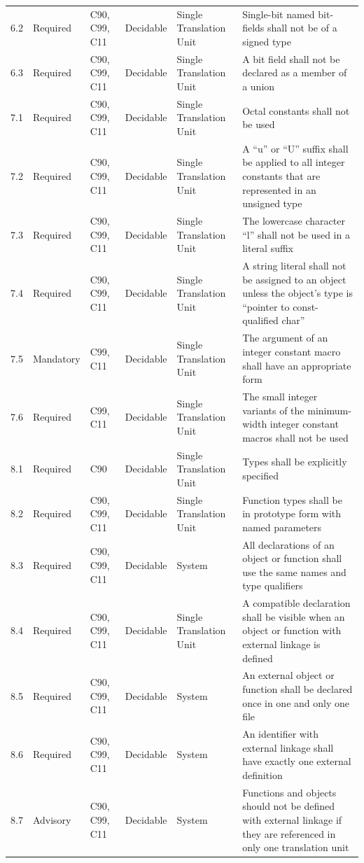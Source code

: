 \documentclass[11pt]{article}
\begin{document}
{\begin{longtable}{@{}p{1.0cm}p{1.6cm}p{1.8cm}p{2.0cm}p{1.6cm}p{7.4cm}@{}}
6.2 & Required & C90, C99, C11 & Decidable & Single Translation Unit & Single-bit named bit-fields shall not be of a signed type \\
6.3 & Required & C90, C99, C11 & Decidable & Single Translation Unit & A bit field shall not be declared as a member of a union \\
7.1 & Required & C90, C99, C11 & Decidable & Single Translation Unit & Octal constants shall not be used \\
7.2 & Required & C90, C99, C11 & Decidable & Single Translation Unit & A ``u'' or ``U'' suffix shall be applied to all integer constants that are represented in an unsigned type \\
7.3 & Required & C90, C99, C11 & Decidable & Single Translation Unit & The lowercase character ``l'' shall not be used in a literal suffix \\
7.4 & Required & C90, C99, C11 & Decidable & Single Translation Unit & A string literal shall not be assigned to an object unless the object's type is ``pointer to const-qualified char'' \\
7.5 & Mandatory & C99, C11 & Decidable & Single Translation Unit & The argument of an integer constant macro shall have an appropriate form \\
7.6 & Required & C99, C11 & Decidable & Single Translation Unit & The small integer variants of the minimum-width integer constant macros shall not be used \\
8.1 & Required & C90 & Decidable & Single Translation Unit & Types shall be explicitly specified \\
8.2 & Required & C90, C99, C11 & Decidable & Single Translation Unit & Function types shall be in prototype form with named parameters \\
8.3 & Required & C90, C99, C11 & Decidable & System & All declarations of an object or function shall use the same names and type qualifiers \\
8.4 & Required & C90, C99, C11 & Decidable & Single Translation Unit & A compatible declaration shall be visible when an object or function with external linkage is defined \\
8.5 & Required & C90, C99, C11 & Decidable & System & An external object or function shall be declared once in one and only one file \\
8.6 & Required & C90, C99, C11 & Decidable & System & An identifier with external linkage shall have exactly one external definition \\
8.7 & Advisory & C90, C99, C11 & Decidable & System & Functions and objects should not be defined with external linkage if they are referenced in only one translation unit \\

\end{longtable}}
\end{document}

